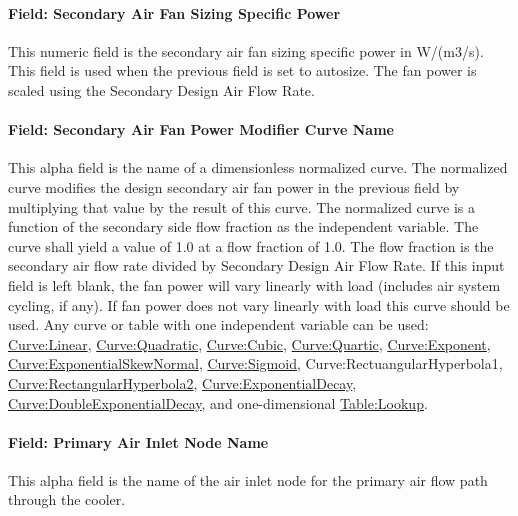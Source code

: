 \paragraph{Field: Secondary Air Fan Sizing Specific Power}\label{field-secondary-air-fan-sizing-specific-power}

This numeric field is the secondary air fan sizing specific power in W/(m3/s). This field is used when the previous field is set to autosize. The fan power is scaled using the Secondary Design Air Flow Rate.

\paragraph{Field: Secondary Air Fan Power Modifier Curve Name}\label{field-secondary-air-fan-power-modifier-curve-name}

This alpha field is the name of a dimensionless normalized curve. The normalized curve modifies the design secondary air fan power in the previous field by multiplying that value by the result of this curve. The normalized curve is a function of the secondary side flow fraction as the independent variable. The curve shall yield a value of 1.0 at a flow fraction of 1.0. The flow fraction is the secondary air flow rate divided by Secondary Design Air Flow Rate. If this input field is left blank, the fan power will vary linearly with load (includes air system cycling, if any). If fan power does not vary linearly with load this curve should be used. Any curve or table with one independent variable can be used: \hyperref[curvelinear]{Curve:Linear}, \hyperref[curvequadratic]{Curve:Quadratic}, \hyperref[curvecubic]{Curve:Cubic}, \hyperref[curvequartic]{Curve:Quartic}, \hyperref[curveexponent]{Curve:Exponent}, \hyperref[curveexponentialskewnormal]{Curve:ExponentialSkewNormal}, \hyperref[curvesigmoid]{Curve:Sigmoid}, Curve:RectuangularHyperbola1, \hyperref[curverectangularhyperbola2]{Curve:RectangularHyperbola2}, \hyperref[curveexponentialdecay]{Curve:ExponentialDecay}, \hyperref[curvedoubleexponentialdecay]{Curve:DoubleExponentialDecay}, and one-dimensional \hyperref[tablelookup]{Table:Lookup}.

\paragraph{Field: Primary Air Inlet Node Name}\label{field-primary-air-inlet-node-name-2}

This alpha field is the name of the air inlet node for the primary air flow path through the cooler.

